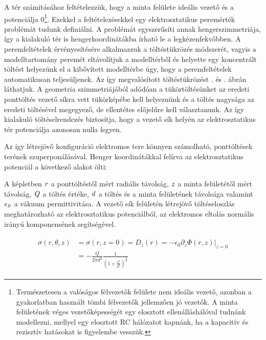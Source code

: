 A tér számításához feltételezzük, hogy a minta felülete ideális vezető és a potenciálja 0\footnote{Természetesen a valóságos félvezetők felülete nem ideális vezető, azonban a gyakorlatban használt tömbi félvezetők jellemzően jó vezetők. A minta felületének véges vezetőképességét egy elosztott ellenálláshálóval tudnánk modellezni, mellyel egy elosztott RC hálózatot kapnánk, ha a kapacitív és rezisztív hatásokat is figyelembe vesszük.}. Ezekkel a feltételezésekkel egy elektrosztatikus peremérték problémát tudunk definiálni. A problémát egyszerűsíti annak hengerszimmetriája, így a kialakuló tér is hengerkoordinátákba írható le a legkézenfekvőbben. A peremfeltételek érvényesítésére alkalmazzuk a töltéstükrözés módszerét\cite{elvil}, vagyis a modelltartomány peremét eltávolítjuk a modelltérből és helyette egy koncentrált töltést helyezünk el a kibővített modelltérbe úgy, hogy a peremfeltételek automatikusan teljesüljenek. Az így megvalósított töltéstükrözést . és . ábrán láthatjuk. A geometria szimmetriájából adódóan a tükörtöltésünket az eredeti ponttöltés vezető síkra vett tükörképébe kell helyeznünk és a töltés nagysága az eredeti töltésével megegyező, de ellentétes előjelűre kell választanunk. Az így kialakuló töltéselrendezés biztosítja, hogy a vezető sík helyén az elektrosztatikus tér potenciálja azonosan nulla legyen.


Az így létrejövő konfiguráció elektromos tere könnyen számolható, ponttöltések terének szuperponálásával. Henger koordinátákkal felírva az elektrosztatikus potenciál a következő alakot ölti:


A képletben $\it{r}$ a ponttöltéstől mért radiális távolság, $\it{z}$ a minta felületétől mért távolság, $\it{Q}$ a töltés értéke, $\it{d}$ a töltés és a minta felületének távolsága valamint $\it{\epsilon_0}$ a vákuum permittivitása. A vezető sík felületén létrejövő töltéseloszlás meghatározható az elektrosztatikus potenciálból, az elektromos eltolás normális irányú komponensének segítségével.

\begin{align}
    \begin{split}
        \sigma(r,\theta,z) &= \sigma(r, z = 0) = D_z(r) = -\epsilon_0\partial_z\Phi(r, z)|_{z = 0} \\
        &= -\frac{Q}{2\pi d^2}\frac{1}{(1+\frac{r^2}{d^2})^{\frac{3}{2}}}
    \end{split}
\end{align}

